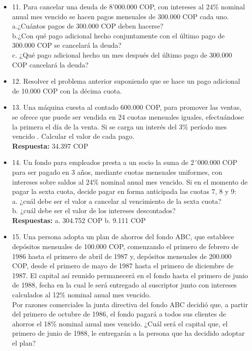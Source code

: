 \begin{itemize}
 \item 11. Para cancelar una deuda de 8'000.000 COP, con intereses al 24\% nominal anual mes vencido se hacen pagos mensuales de 300.000 COP cada uno.\\
       a.¿Cuántos pagos de 300.000 COP deben hacerse?\\
       b.¿Con qué pago adicional hecho conjuntamente con el último pago de 300.000 COP se cancelará la deuda?\\
       c. ¿Qué pago adicional hecho un mes después del último pago de 300.000 COP cancelará la deuda?\\
       \medskip

 \item 12. Resolver el problema anterior suponiendo que se hace un pago adicional de 10.000 COP con la décima cuota.\\
       \medskip

 \item 13. Una máquina cuesta al contado 600.000 COP, para promover las ventas, se ofrece que puede ser vendida en 24 cuotas mensuales iguales, efectuándose la primera el día de la venta. Si se carga un interés del 3\% período mes vencido . Calcular el valor de cada pago.\\
       \textbf{Respuesta:} 34.397 COP\\
       \medskip

 \item 14. Un fondo para empleados presta a un socio la suma de 2´000.000 COP para ser pagado en 3 años, mediante cuotas mensuales uniformes, con intereses sobre saldos al 24\% nominal anual mes vencido. Si en el momento de pagar la sexta cuota, decide pagar en forma anticipada las cuotas 7, 8 y 9:\\
       a. ¿cuál debe ser el valor a cancelar al vencimiento de la sexta cuota?\\
       b. ¿cuál debe ser el valor de los intereses descontados?\\
       \textbf{Respuestas:} a. 304.752 COP \hspace{1,5cm}b. 9.111 COP\\
       \medskip

 \item 15. Una  persona adopta un plan de ahorros del fondo ABC, que establece depósitos mensuales de 100.000 COP, comenzando el primero de febrero de 1986 hasta el primero de abril de 1987 y, depósitos mensuales de 200.000 COP, desde el primero de mayo de 1987 hasta el primero de diciembre de 1987. El capital así reunido permanecerá en el fondo hasta el primero de junio de 1988, fecha en la cual le será entregado al suscriptor junto con intereses calculados al 12\% nominal anual mes vencido. \\
       Por razones comerciales la junta directiva del fondo ABC decidió que, a partir del primero de octubre de 1986, el fondo pagará a todos sus clientes de ahorros el 18\% nominal anual mes vencido. ¿Cuál será el capital que, el primero de junio de 1988, le entregarán a la persona que ha decidido adoptar el plan?\\
       \medskip


\end{itemize}

